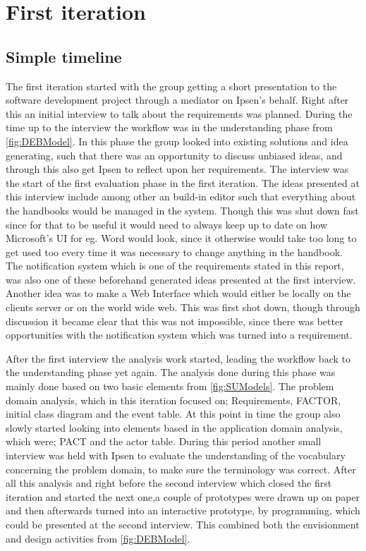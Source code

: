 \section{First iteration}\label{sec:Iteration1}
\subsection{Simple timeline}
The first iteration started with the group getting a short presentation to the software development project through a mediator on Ipsen's behalf.
Right after this an initial interview to talk about the requirements was planned.
During the time up to the interview the workflow was in the understanding phase from \cref{fig:DEBModel}.
In this phase the group looked into existing solutions and idea generating, such that there was an opportunity to discuss unbiased ideas, and through this also get Ipsen to reflect upon her requirements.
The interview was the start of the first evaluation phase in the first iteration.
The ideas presented at this interview include among other an build-in editor such that everything about the handbooks would be managed in the system.
Though this was shut down fast since for that to be useful it would need to always keep up to date on how Microsoft's UI for eg. Word would look, since it otherwise would take too long to get used too every time it was necessary to change anything in the handbook.
The notification system which is one of the requirements stated in this report, was also one of these beforehand generated ideas presented at the first interview. 
Another idea was to make a Web Interface which would either be locally on the clients server or on the world wide web. This was first shot down, though through discussion it became clear that this was not impossible, since there was better opportunities with the notification system which was turned into a requirement.

After the first interview the analysis work started, leading the workflow back to the understanding phase yet again.
The analysis done during this phase was mainly done based on two basic elements from \cref{fig:SUModels}.
The problem domain analysis, which in this iteration focused on; Requirements, FACTOR, initial class diagram and the event table.
At this point in time the group also slowly started looking into elements based in the application domain analysis, which were; PACT and the actor table.
During this period another small interview was held with Ipsen to evaluate the understanding of the vocabulary concerning the problem domain, to make sure the terminology was correct.
After all this analysis and right before the second interview which closed the first iteration and started the next one,a couple of prototypes were drawn up on paper and then afterwards turned into an interactive prototype, by programming, which could be presented at the second interview.
This combined both the envisionment and design activities from \cref{fig:DEBModel}.

